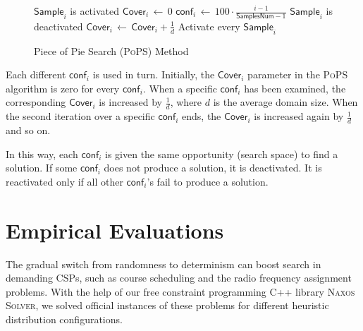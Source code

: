 \documentclass{ws-ijait}
\begin{document}
\begin{figure}
  \centering
  \begin{algorithmic}
        \State $\mathsf{Sample}_i$ is activated
        \State $\mathsf{Cover}_i \, \gets \, 0$
        \State $\mathsf{conf}_i \, \gets \,
                100 \cdot \frac{i - 1}{\mathsf{SamplesNum} - 1}$
      \EndFor
            \State $\mathsf{Sample}_i$ is deactivated
          \EndIf
          \State $\mathsf{Cover}_i \, \gets \,
                  \mathsf{Cover}_i + \frac{1}{d}$
        \EndFor
          \State Activate every $\mathsf{Sample}_i$
        \EndIf
      \EndWhile
    \EndFunction
  \end{algorithmic}
  \caption{Piece of Pie Search ({\normalfont\textsc{PoPS}})
           Method\label{pops}}
\end{figure}

Each different $\mathsf{conf}_i$ is used in turn. Initially,
the $\mathsf{Cover}_i$ parameter in the \textsc{PoPS}
algorithm is zero for every $\mathsf{conf}_i$. When a
specific $\mathsf{conf}_i$ has been examined, the
corresponding $\mathsf{Cover}_i$ is increased by
$\frac{1}{d}$, where $d$ is the average domain size. When
the second iteration over a specific $\mathsf{conf}_i$ ends,
the $\mathsf{Cover}_i$ is increased again by $\frac{1}{d}$
and so on.

In this way, each $\mathsf{conf}_i$ is given the same
opportunity (search space) to find a solution. If some
$\mathsf{conf}_i$ does not produce a solution, it is
deactivated. It is reactivated only if all other
$\mathsf{conf}_i$'s fail to produce a solution.


\section{Empirical Evaluations}

The gradual switch from randomness to determinism can boost
search in demanding CSPs, such as course scheduling and the
radio frequency assignment problems. With the help of our
free constraint programming C++ library \textsc{Naxos
Solver},\cite{Naxos} we solved official instances of these
problems for different heuristic distribution
configurations.
\end{document}
